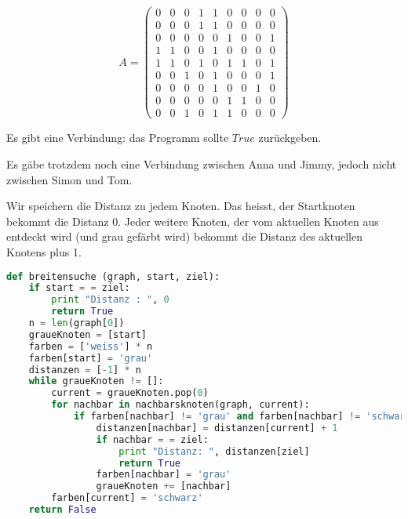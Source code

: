 \begin{lsg}
\[A =  \begin{pmatrix}
  0 & 0 & 0 & 1 & 1 & 0 & 0 & 0 & 0  \\
  0 & 0 & 0 & 1 & 1 & 0 & 0 & 0 & 0  \\
  0 & 0 & 0 & 0 & 0 & 1 & 0 & 0 & 1  \\
  1 & 1 & 0 & 0 & 1 & 0 & 0 & 0 & 0  \\
  1 & 1 & 0 & 1 & 0 & 1 & 1 & 0 & 1  \\
  0 & 0 & 1 & 0 & 1 & 0 & 0 & 0 & 1  \\
  0 & 0 & 0 & 0 & 1 & 0 & 0 & 1 & 0  \\
  0 & 0 & 0 & 0 & 0 & 1 & 1 & 0 & 0  \\
  0 & 0 & 1 & 0 & 1 & 1 & 0 & 0 & 0 
 \end{pmatrix}
  \]
\end{lsg}

\begin{lsg}
Es gibt eine Verbindung: das Programm sollte $True$ zur\"uckgeben.
\end{lsg}

\begin{lsg}
Es g\"abe trotzdem noch eine Verbindung zwischen Anna und Jimmy, jedoch nicht zwischen Simon und Tom.
\end{lsg}

\begin{lsg}
Wir speichern die Distanz zu jedem Knoten. Das heisst, der Startknoten bekommt die Distanz 0. Jeder weitere Knoten, der vom aktuellen Knoten aus entdeckt wird (und grau gef\"arbt wird) bekommt die Distanz des aktuellen Knotens plus 1.
\end{lsg}

\begin{lsg}
\hfill
\begin{lstlisting}[language=Python,basicstyle=\small,tabsize=3]
def breitensuche (graph, start, ziel):
	if start = = ziel:
		print "Distanz : ", 0
		return True
	n = len(graph[0])
	graueKnoten = [start]
	farben = ['weiss'] * n
	farben[start] = 'grau'
	distanzen = [-1] * n
	while graueKnoten != []:
		current = graueKnoten.pop(0)
		for nachbar in nachbarsknoten(graph, current):
			if farben[nachbar] != 'grau' and farben[nachbar] != 'schwarz':
				distanzen[nachbar] = distanzen[current] + 1
				if nachbar = = ziel:
					print "Distanz: ", distanzen[ziel]
					return True
				farben[nachbar] = 'grau'
				graueKnoten += [nachbar]
		farben[current] = 'schwarz'
	return False
\end{lstlisting}
\end{lsg}

